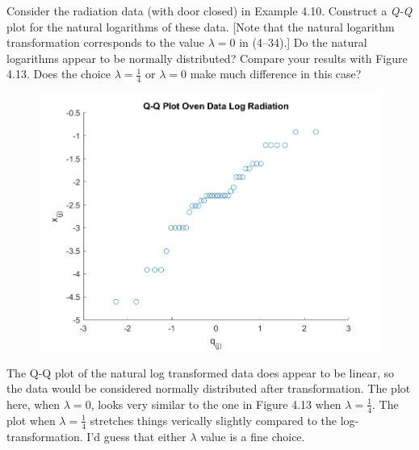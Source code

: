 Consider the radiation data (with door closed) in Example 4.10. Construct a \textit{Q-Q} plot
for the natural logarithms of these data. [Note that the natural logarithm transformation
corresponds to the value $\lambda = 0$ in (4--34).] Do the natural logarithms appear to be normally
distributed? Compare your results with Figure 4.13. Does the choice $\lambda = \frac{1}{4}$ or
$\lambda = 0$ make much difference in this case?

\begin{figure}[H]
    \includegraphics[scale=0.8]{./matlab/chapter-4/sol4.27.png}
\end{figure}

The Q-Q plot of the natural log transformed data does appear to be linear, so the data would be considered normally distributed after transformation. The plot here, when $\lambda = 0$, looks very similar to the one in Figure 4.13 when $\lambda = \frac{1}{4}$. The plot when $\lambda = \frac{1}{4}$ stretches things verically slightly compared to the log-transformation. I'd guess that either $\lambda$ value is a fine choice.
